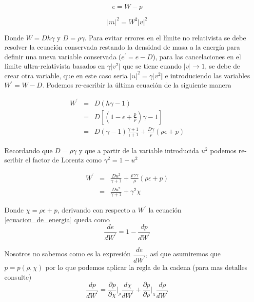 \documentclass[12pt,a4paper]{book}
\providecommand{\abs}[1]{\lvert#1\rvert} %
\begin{document}
\begin{equation}\label{ecuacion_de_energia}
e=W-p
\end{equation}

\begin{equation}\label{modulos de los momentos}
\abs{m}^2= W^{2}\abs{v}^{2}
\end{equation}

Donde $W=D h \gamma$ y $D=\rho \gamma$. Para evitar errores en el límite no relativista se debe resolver la ecuación conservada restando la densidad de masa 
a la energía para definir una nueva variable conservada ($e^{'}=e-D$), para las cancelaciones en el límite ultra-relativista basados en $\gamma \abs{v^2}$ que se tiene cuando $\abs{v} \rightarrow 1$, se debe de crear otra variable, que en este caso seria $\abs{u}^2=\gamma \abs{v^2}$ e introduciendo las variables $W^{'}=W-D$. Podemos re-escribir la última ecuación de la siguiente manera

\begin{eqnarray*}
 W^{'}& = &D(h \gamma -1)\\
&=& D\left[ \left(1-\epsilon+ \frac{p}{\rho}\right) \gamma - 1 \right]\\
&=& D \left(\gamma-1 \right) \frac{\gamma+1}{\gamma+1}+\frac{D \gamma }{\rho}\left(\rho \epsilon + p \right)
\end{eqnarray*}

Recordando que $D=\rho \gamma$ y que a partir de la variable introducida $u^{2}$ podemos re-scribir el factor de Lorentz como $\gamma^{2} = 1- u^{2}$

\begin{eqnarray}\label{W_prima}
\nonumber W^{'}&=&\frac{D u^{2}}{\gamma + 1}
+\frac{\rho\gamma \gamma}{ \rho }\left(\rho \epsilon + p \right)\\
&=& \frac{D u^{2}}{\gamma + 1} + \gamma^{2} \chi
\end{eqnarray}

Donde $\chi=\rho \epsilon + p$, derivando con respecto a $W^{'}$ la ecuación \ref{ecuacion_de_energia} queda como
\begin{equation}\label{derivada_E_W}
\dfrac{de}{dW^{'}}=1-\dfrac{dp}{dW^{'}}
\end{equation}

Nosotros no sabemos como es la expresión $\dfrac{de}{dW^{'}}$, así que asumiremos que $p=p(\rho, \chi)$ por lo que podemos aplicar la regla de la cadena (para mas detalles consulte)
\begin{equation}\label{cadena}
\dfrac{dp}{dW^{'}}=\dfrac{\partial p}{\partial\chi}\Bigg |_{\rho} \dfrac{d\chi}{dW^{'}} + \dfrac{\partial p}{\partial \rho}\Big |_{\chi} \dfrac{d \rho}{d W^{'}}
\end{equation}
\end{document}
